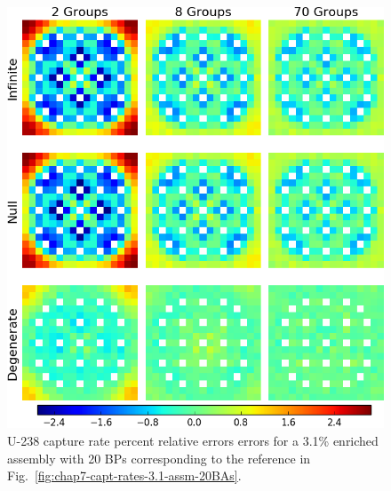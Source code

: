 \begin{figure}[h!]
\centering
\includegraphics[width=\linewidth]{figures/quantification/assm-31-20BPs/capt-err}
\caption[U-238 capture rate errors for a 3.1\% enriched assembly with 20 BPs]{U-238 capture rate percent relative errors errors for a 3.1\% enriched assembly with 20 \acp{BP} corresponding to the reference in Fig.~\ref{fig:chap7-capt-rates-3.1-assm-20BAs}.}
\label{fig:chap8-assm-3.1-20BPs-capt-err}
\end{figure}

\clearpage

